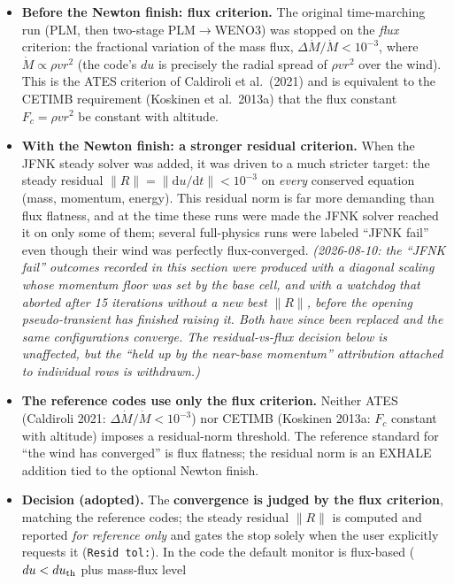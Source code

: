 \documentclass[english,a4paper]{my_memo}
\begin{document}
\begin{itemize}
\item \textbf{Before the Newton finish: flux criterion.} The original
  time-marching run (PLM, then two-stage PLM$\to$WENO3) was stopped on the
  \emph{flux} criterion: the fractional variation of the mass flux,
  $\Delta\dot M/\dot M < 10^{-3}$, where $\dot M \propto \rho v r^2$ (the code's
  $du$ is precisely the radial spread of $\rho v r^2$ over the wind). This is the
  ATES criterion of Caldiroli et al.\ (2021) and is equivalent to the CETIMB
  requirement (Koskinen et al.\ 2013a) that the flux constant $F_c = \rho v r^2$
  be constant with altitude.
\item \textbf{With the Newton finish: a stronger residual criterion.} When the
  JFNK steady solver was added, it was driven to a much stricter target: the
  steady residual $\lVert R\rVert = \lVert\mathrm{d}u/\mathrm{d}t\rVert < 10^{-3}$
  on \emph{every} conserved equation (mass, momentum, energy). This residual norm
  is far more demanding than flux flatness, and at the time these runs were made
  the JFNK solver reached it on only some of them; several full-physics runs were
  labeled ``JFNK fail'' even though their wind was perfectly flux-converged.
  \emph{(2026-08-10: the ``JFNK fail'' outcomes recorded in this section were
  produced with a diagonal scaling whose momentum floor was set by the base cell,
  and with a watchdog that aborted after 15 iterations without a new best
  $\lVert R\rVert$, before the opening pseudo-transient has finished raising
  it. Both have since been replaced and the same configurations converge.
  The residual-vs-flux \emph{decision} below is unaffected, but the ``held up by the near-base
  momentum'' attribution attached to individual rows is withdrawn.)}
\item \textbf{The reference codes use only the flux criterion.} Neither ATES
  (Caldiroli 2021: $\Delta\dot M/\dot M < 10^{-3}$) nor CETIMB (Koskinen 2013a:
  $F_c$ constant with altitude) imposes a residual-norm threshold. The reference
  standard for ``the wind has converged'' is flux flatness; the residual norm is
  an EXHALE addition tied to the optional Newton finish.
\item \textbf{Decision (adopted).} The \textbf{convergence is judged by the flux
  criterion}, matching the reference codes; the steady residual $\lVert R\rVert$
  is computed and reported \emph{for reference only} and gates the stop solely
  when the user explicitly requests it (\texttt{Resid tol:}). In the code the
  default monitor is flux-based ($du < du_{\rm th}$ plus mass-flux level

\end{itemize}
\end{document}
